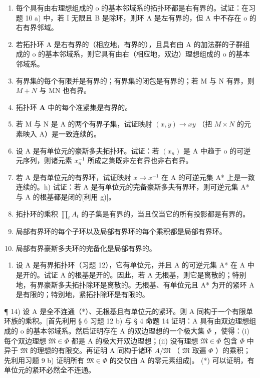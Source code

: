 \begin{enumerate}
\def\labelenumi{\alph{enumi})}
\item
  每个具有由右理想组成的 o 的基本邻域系的拓扑环都是右有界的。试证：在习题 10 a) 中，若 I 无限且 B 是除环，则环 A 是左有界的，但 A 中不存在 o 的右有界邻域。
\item
  若拓扑环 A 是右有界的（相应地，有界的），且具有由 A 的加法群的子群组成的 o 的基本邻域系，则它具有由右（相应地，双边）理想组成的 o 的基本邻域系。
\item
  有界集的每个有限并是有界的；有界集的闭包是有界的；若 M 与 N 有界，则 \(M + N\) 与 MN 也有界。
\item
  拓扑环 \(\mathbf{A}\) 中的每个准紧集是有界的。
\item
  若 M 与 N 是 A 的两个有界子集，试证映射 \((x, y) \to xy\) （把 \(M \times N\) 的元素映入 A）是一致连续的。
\item
  设 A 是有单位元的豪斯多夫拓扑环。试证：若 \((x_{n})\) 是 A 中趋于 o 的可逆元序列，则诸元素 \(x_{n}^{-1}\) 所成之集既非左有界也非右有界。
\item
  若 A 是有单位元的有界环，试证映射 \(x \rightarrow x^{-1}\) 在 A 的可逆元集 A* 上是一致连续的。h) 试证：若 A 是有单位元的完备豪斯多夫有界环，则可逆元集 A* 与 A 的根基都是闭的{[}利用 g){]}。
\item
  拓扑环的乘积 \(\prod_{t} A_{t}\) 的子集是有界的，当且仅当它的所有投影都是有界的。
\item
  局部有界环的每个子环以及局部有界环的每个乘积都是局部有界环。
\item
  局部有界豪斯多夫环的完备化是局部有界的。
\end{enumerate}

\begin{enumerate}
\def\labelenumi{\arabic{enumi})}
\setcounter{enumi}{12}
\tightlist
\item
  设 A 是有界拓扑环（习题 12），它有单位元，并且 A 的可逆元集 A* 在 A 中是开的。试证 A 的根基是开的。因此，若 A 无根基，则它是离散的；特别地，有界豪斯多夫拓扑除环是离散的。无根基、有单位元且 A* 为开的紧环 A 是有限的；特别地，紧拓扑除环是有限的。
\end{enumerate}

¶ 14) 设 A 是全不连通（*）、无根基且有单位元的紧环。则 A 同构于一个有限单环族的乘积。{[}首先利用 § 6 习题 12 b) 与 § 4 命题 14 证明：A 具有由双边理想组成的 o 的基本邻域系。然后证明存在 A 的双边理想的一个极大集 \(\Phi\) ，使得：(i) 每个双边理想 \(\mathfrak{M} \in \Phi\) 都是 A 的极大开双边理想；(ii) 没有理想 \(\mathfrak{M} \in \Phi\) 包含 \(\Phi\) 中异于 \(\mathfrak{M}\) 的理想的有限交。再证明 A 同构于诸环 \(A/\mathfrak{M}\) （ \(\mathfrak{M}\) 取遍 \(\Phi\) ）的乘积；先利用习题 9 b) 证明所有 \(\mathfrak{M} \in \Phi\) 的交仅由 A 的零元素组成{]}。
(*) 可以证明，有单位元的紧环必然全不连通。

